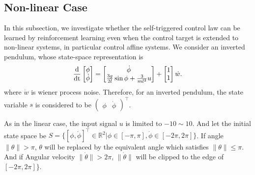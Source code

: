 \documentclass[english, dvipdfmx]{ampmt}             %
\newcommand{\odif}[2]{\frac{\rm{d}#1}{\rm{d}#2}}
\begin{document}
\subsection{Non-linear Case}
In this subsection, we investigate whether the self-triggered control law can be learned by reinforcement learning even when the control target is extended to non-linear systems, in particular  control affine systems. We consider an inverted pendulum, whose state-space representation is
\begin{equation}
	\odif{}{t}\begin{bmatrix}\phi \\ \dot{\phi}\end{bmatrix} = 
		\begin{bmatrix}\dot{\phi} \\ \frac{3g}{2l}\sin{\phi} + \frac{3}{ml^2}u \end{bmatrix} + \begin{bmatrix}1 \\ 1\end{bmatrix}\dot{w}\label{pendulum}.
\end{equation}
where $\dot{w}$ is wiener process noise. Therefore, for an inverted pendulum, the state variable $s$ is considered to be $\begin{pmatrix}\phi & \dot{\phi}\end{pmatrix}^{\top}$.
\par
As in the linear case, the input signal $u$ is limited to $-10 \sim 10$. And let the initial state space be $S = \{[\phi, \dot{\phi}]^{\top}\in \mathbb{R}^2| \phi\in[-\pi,\pi], \dot{\phi}\in[-2\pi,2\pi]\}$. 
If angle $\|\theta\| > \pi$, $\theta$ will be replaced by the equivalent angle which satisfies $\|\theta\| \leq \pi$. And if Angular velocity $\|\dot{\theta}\| > 2\pi$, $\|\dot{\theta}\|$ will be clipped to the edge of $[-2\pi,2\pi]\}$.
\fi
\end{document}

